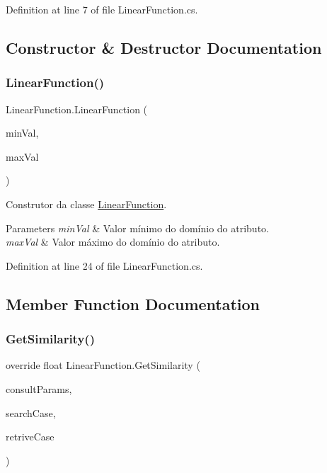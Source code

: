 Definition at line 7 of file Linear\+Function.\+cs.



\subsection{Constructor \& Destructor Documentation}
\hypertarget{class_linear_function_ac8a3882badd498ea34c032d63aca3715}{}\label{class_linear_function_ac8a3882badd498ea34c032d63aca3715} 
\subsubsection{\texorpdfstring{Linear\+Function()}{LinearFunction()}}
{\footnotesize\ttfamily Linear\+Function.\+Linear\+Function (\begin{DoxyParamCaption}\item[{float}]{min\+Val,  }\item[{float}]{max\+Val }\end{DoxyParamCaption})}



Construtor da classe \hyperlink{class_linear_function}{Linear\+Function}. 


\begin{DoxyParams}{Parameters}
{\em min\+Val} & Valor mínimo do domínio do atributo.\\
\hline
{\em max\+Val} & Valor máximo do domínio do atributo.\\
\hline
\end{DoxyParams}


Definition at line 24 of file Linear\+Function.\+cs.



\subsection{Member Function Documentation}
\hypertarget{class_linear_function_addbfc2ff35037c40ae27c30e993e82ca}{}\label{class_linear_function_addbfc2ff35037c40ae27c30e993e82ca} 
\subsubsection{\texorpdfstring{Get\+Similarity()}{GetSimilarity()}}
{\footnotesize\ttfamily override float Linear\+Function.\+Get\+Similarity (\begin{DoxyParamCaption}\item[{\hyperlink{class_consult_params}{Consult\+Params}}]{consult\+Params,  }\item[{\hyperlink{class_case}{Case}}]{search\+Case,  }\item[{\hyperlink{class_case}{Case}}]{retrive\+Case }\end{DoxyParamCaption})\hspace{0.3cm}{\ttfamily [virtual]}}



